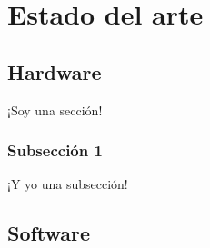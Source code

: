 \chapter{Estado del arte}
\label{cap:estado_del_arte}

\section{Hardware}
¡Soy una sección!
	\subsection{Subsección 1}
	¡Y yo una subsección!
\section{Software}

